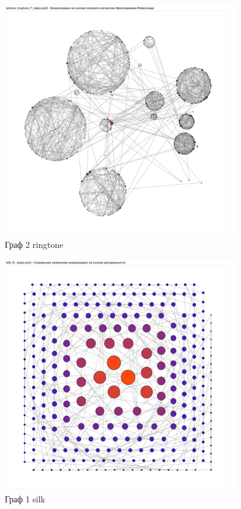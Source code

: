 \begin{figure}[H]
	\caption{Граф 2 ringtone}
	\includegraphics[width=0.9\textwidth]{img/ringtone2.pdf}
\end{figure}

\begin{figure}[H]
	\caption{Граф 1 silk}
	\includegraphics[width=0.9\textwidth]{img/silk1.pdf}
\end{figure}

